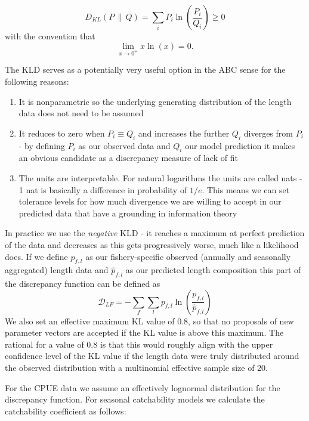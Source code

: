 \documentclass[11pt]{article}
\newcommand{\wh}{\widehat}
\newcommand{\ds}{\displaystyle}
\begin{document}
\begin{equation*}
    \ds D_{KL}(P\,\parallel\,Q)=\sum\limits_i P_i\ln\left(\frac{P_i}{Q_i}\right)\geq 0
\end{equation*}
with the convention that
\begin{equation*}
    \ds \lim\limits_{x\rightarrow 0^+} x\ln(x) = 0.
\end{equation*}

The KLD serves as a potentially very useful option in the ABC sense for the following reasons:

\begin{enumerate}
    \item It is nonparametric so the underlying generating distribution of the length data does not need to be assumed
    \item It reduces to zero when $P_i\equiv Q_i$ and increases the further $Q_i$ diverges from $P_i$ - by defining $P_i$ as our observed data and $Q_i$ our model prediction it makes an obvious candidate as a discrepancy measure of lack of fit
    \item The units are interpretable. For natural logarithms the units are called nats - 1 nat is basically a difference in probability of $1/e$. This means we can set tolerance levels for how much divergence we are willing to accept in our predicted data that have a grounding in information theory
\end{enumerate}

In practice we use the \emph{negative} KLD - it reaches a maximum at perfect prediction of the data and decreases as this gets progressively worse, much like a likelihood does. If we define $p_{f,l}$ as our fishery-specific observed (annually and seasonally aggregated) length data and $\wh{p}_{f,l}$ as our predicted length composition this part of the discrepancy function can be defined as
\begin{equation*}
    \ds \mathcal{D}_{LF}=-\sum\limits_f\sum\limits_l p_{f,l}\ln\left(\frac{p_{f,l}}{\wh{p}_{f,l}}\right)
\end{equation*}
We also set an effective maximum KL value of 0.8, so that no proposals of new parameter vectors are accepted if the KL value is above this maximum. The rational for a value of 0.8 is that this would roughly align with the upper confidence level of the KL value if the length data were truly distributed around the observed distribution with a multinomial effective sample size of 20. 

For the CPUE data we assume an effectively lognormal distribution for the discrepancy function. For seasonal catchability models we calculate the catchability coefficient as follows:
\end{document}

